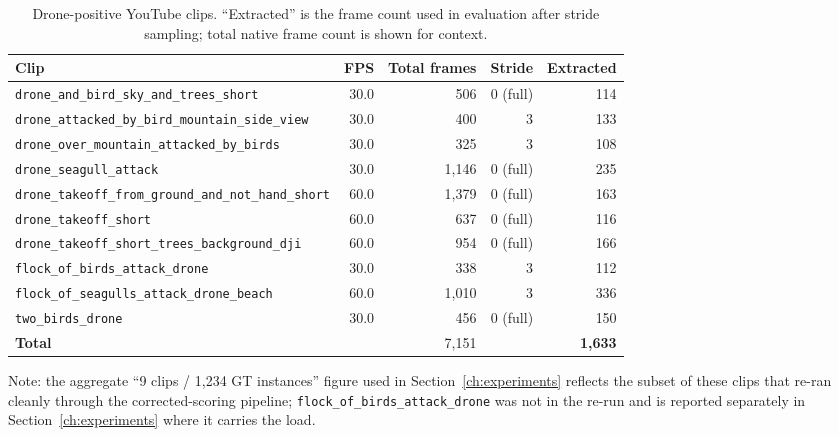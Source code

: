 \begin{table}[htbp]
    \centering
    \caption{Drone-positive YouTube clips. ``Extracted'' is the frame count used in evaluation after stride sampling; total native frame count is shown for context.}
    \label{tab:youtube_drone_clips}
    \begin{tabular}{lrrrr}
        \toprule
        Clip & FPS & Total frames & Stride & Extracted \\
        \midrule
        \texttt{drone\_and\_bird\_sky\_and\_trees\_short}     & 30.0 &   506 & 0 (full) & 114 \\
        \texttt{drone\_attacked\_by\_bird\_mountain\_side\_view} & 30.0 & 400 & 3 & 133 \\
        \texttt{drone\_over\_mountain\_attacked\_by\_birds}   & 30.0 &   325 & 3 & 108 \\
        \texttt{drone\_seagull\_attack}                        & 30.0 & 1{,}146 & 0 (full) & 235 \\
        \texttt{drone\_takeoff\_from\_ground\_and\_not\_hand\_short} & 60.0 & 1{,}379 & 0 (full) & 163 \\
        \texttt{drone\_takeoff\_short}                         & 60.0 & 637 & 0 (full) & 116 \\
        \texttt{drone\_takeoff\_short\_trees\_background\_dji} & 60.0 & 954 & 0 (full) & 166 \\
        \texttt{flock\_of\_birds\_attack\_drone}              & 30.0 & 338 & 3 & 112 \\
        \texttt{flock\_of\_seagulls\_attack\_drone\_beach}    & 60.0 & 1{,}010 & 3 & 336 \\
        \texttt{two\_birds\_drone}                              & 30.0 & 456 & 0 (full) & 150 \\
        \midrule
        \textbf{Total} & & 7{,}151 & & \textbf{1{,}633} \\
        \bottomrule
    \end{tabular}
\end{table}

\noindent Note: the aggregate ``9 clips / 1{,}234 GT instances'' figure used in Section~\ref{ch:experiments} reflects the subset of these clips that re-ran cleanly through the corrected-scoring pipeline; \texttt{flock\_of\_birds\_attack\_drone} was not in the re-run and is reported separately in Section~\ref{ch:experiments} where it carries the load.

